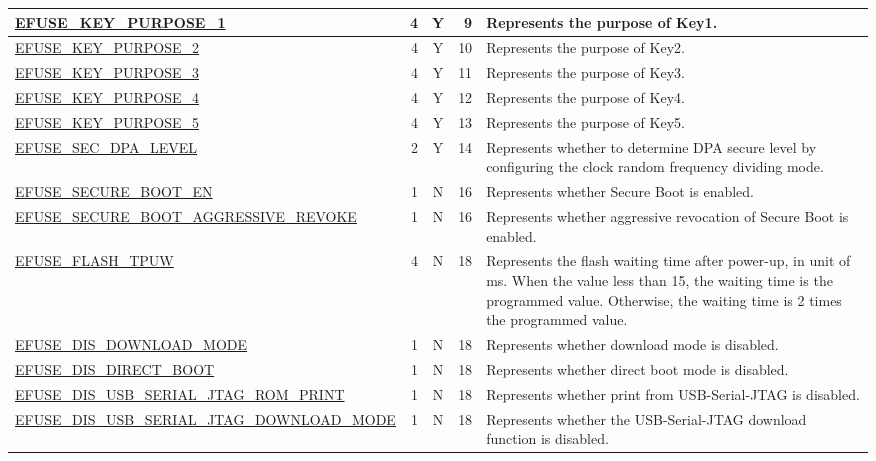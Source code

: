 \begin{longtable}[l]{ |m{8.2cm}|r|c|r|m{9cm}| }
    \hline
    \hyperref[fielddesc:EFUSEKEYPURPOSE1]{EFUSE\_KEY\_PURPOSE\_1} & 4 & Y & 9 & Represents the purpose of Key1.\\
    \hline
    \hyperref[fielddesc:EFUSEKEYPURPOSE2]{EFUSE\_KEY\_PURPOSE\_2} & 4 & Y & 10 & Represents the purpose of Key2.\\
    \hline
    \hyperref[fielddesc:EFUSEKEYPURPOSE3]{EFUSE\_KEY\_PURPOSE\_3} & 4 & Y & 11 & Represents the purpose of Key3.\\
    \hline
    \hyperref[fielddesc:EFUSEKEYPURPOSE4]{EFUSE\_KEY\_PURPOSE\_4} & 4 & Y & 12 & Represents the purpose of Key4.\\
    \hline
    \hyperref[fielddesc:EFUSEKEYPURPOSE5]{EFUSE\_KEY\_PURPOSE\_5} & 4 & Y & 13 & Represents the purpose of Key5.\\
    \hline
    \hyperref[fielddesc:EFUSESECDPALEVEL]{EFUSE\_SEC\_DPA\_LEVEL} & 2 & Y & 14 & Represents whether to determine DPA secure level by configuring the clock random frequency dividing mode.\\
    \hline
    \hyperref[fielddesc:EFUSESECUREBOOTEN]{EFUSE\_SECURE\_BOOT\_EN} & 1 & N & 16 & Represents whether Secure Boot is enabled.\\
    \hline
    \hyperref[fielddesc:EFUSESECUREBOOTAGGRESSIVEREVOKE]{EFUSE\_SECURE\_BOOT\_AGGRESSIVE\_REVOKE} & 1 & N & 16 & Represents whether aggressive revocation of Secure Boot is enabled.\\
    \hline
    \hyperref[fielddesc:EFUSEFLASHTPUW]{EFUSE\_FLASH\_TPUW} & 4 & N & 18 & Represents the flash waiting time after power-up, in unit of ms. When the value less than 15, the waiting time is the programmed value. Otherwise, the waiting time is 2 times the programmed value.\\
    \hline
    \hyperref[fielddesc:EFUSEDISDOWNLOADMODE]{EFUSE\_DIS\_DOWNLOAD\_MODE} & 1 & N & 18 & Represents whether download mode is disabled.\\
    \hline
    \hyperref[fielddesc:EFUSEDISDIRECTBOOT]{EFUSE\_DIS\_DIRECT\_BOOT} & 1 & N & 18 & Represents whether direct boot mode is disabled.\\
    \hline
    \hyperref[fielddesc:EFUSEDISUSBSERIALJTAGROMPRINT]{EFUSE\_DIS\_USB\_SERIAL\_JTAG\_ROM\_PRINT} & 1 & N & 18 & Represents whether print from USB-Serial-JTAG is disabled.\\
    \hline
    \hyperref[fielddesc:EFUSEDISUSBSERIALJTAGDOWNLOADMODE]{EFUSE\_DIS\_USB\_SERIAL\_JTAG\_DOWNLOAD\_MODE} & 1 & N & 18 & Represents whether the USB-Serial-JTAG download function is disabled.\\

\end{longtable}
